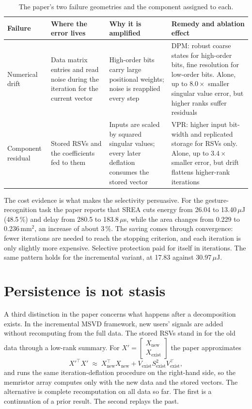 \documentclass[11pt]{article}
\theoremstyle{definition}
\theoremstyle{remark}
\begin{document}
\begin{table}[t]
\centering
\small
\begin{tabularx}{\textwidth}{@{}p{2.3cm}XXX@{}}
\toprule
Failure & Where the error lives & Why it is amplified & Remedy and ablation effect \\
\midrule
Numerical drift & Data matrix entries and read noise during the iteration for the current vector & High-order bits carry large positional weights; noise is reapplied every step & DPM: robust coarse states for high-order bits, fine resolution for low-order bits. Alone, up to $8.0\times$ smaller singular value error, but higher ranks suffer residuals \\
Component residual & Stored RSVs and the coefficients fed to them & Inputs are scaled by squared singular values; every later deflation consumes the stored vector & VPR: higher input bit-width and replicated storage for RSVs only. Alone, up to $3.4\times$ smaller error, but drift flattens higher-rank iterations \\
\bottomrule
\end{tabularx}
\caption{The paper's two failure geometries and the component assigned to each.}
\label{tab:failures}
\end{table}

The cost evidence is what makes the selectivity persuasive. For the gesture-recognition task the paper reports that SREA cuts energy from 26.04 to 13.40\,$\mu$J (48.5\,\%) and delay from 280.5 to 183.8\,$\mu$s, while the area changes from 0.229 to 0.236\,mm$^{2}$, an increase of about 3\,\%. The saving comes through convergence: fewer iterations are needed to reach the stopping criterion, and each iteration is only slightly more expensive. Selective protection paid for itself in iterations. The same pattern holds for the incremental variant, at 17.83 against 30.97\,$\mu$J.

\section{Persistence is not stasis}

A third distinction in the paper concerns what happens after a decomposition exists. In the incremental MSVD framework, new users' signals are added without recomputing from the full data. The stored RSVs stand in for the old data through a low-rank summary. For $X'=\begin{bmatrix}X_{\mathrm{new}}\\ X_{\mathrm{exist}}\end{bmatrix}$ the paper approximates
\begin{equation}
  X'^{\top}X' \;\approx\; X_{\mathrm{new}}^{\top}X_{\mathrm{new}} + V_{\mathrm{exist}}S_{\mathrm{exist}}^{2}V_{\mathrm{exist}}^{\top},
  \label{eq:incremental}
\end{equation}
and runs the same iteration-deflation procedure on the right-hand side, so the memristor array computes only with the new data and the stored vectors. The alternative is complete recomputation on all data so far. The first is a continuation of a prior result. The second replays the past.
\end{document}
